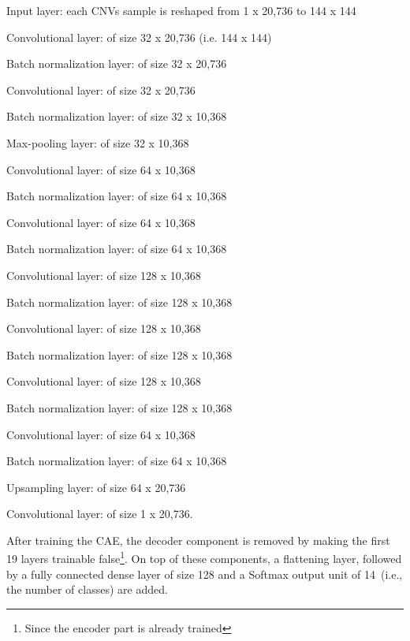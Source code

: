 \begin{enumerate}[noitemsep]
    \scriptsize{
        \item Input layer: each CNVs sample is reshaped from 1 x 20,736 to 144 x 144
        \item Convolutional layer: of size 32 x 20,736 (i.e. 144 x 144) 
        \item Batch normalization layer: of size 32 x 20,736
        \item Convolutional layer: of size 32 x 20,736
        \item Batch normalization layer: of size 32 x 10,368
        \item Max-pooling layer: of size 32 x 10,368
        \item Convolutional layer: of size 64 x 10,368
        \item Batch normalization layer: of size 64 x 10,368
        \item Convolutional layer: of size 64 x 10,368
        \item Batch normalization layer: of size 64 x 10,368
        \item Convolutional layer: of size 128 x 10,368
        \item Batch normalization layer: of size 128 x 10,368
        \item Convolutional layer: of size 128 x 10,368
        \item Batch normalization layer: of size 128 x 10,368
        \item Convolutional layer: of size 128 x 10,368
        \item Batch normalization layer: of size 128 x 10,368
        \item Convolutional layer: of size 64 x 10,368
        \item Batch normalization layer: of size 64 x 10,368
        \item Upsampling layer: of size 64 x 20,736 
        \item Convolutional layer: of size 1 x 20,736.}
\end{enumerate}

\hspace*{3.5mm} After training the CAE, the decoder component is removed by making the first 19 layers trainable false\footnote{Since the encoder part is already trained}. On top of these components, a flattening layer, followed by a fully connected dense layer of size 128 and a Softmax output unit of 14~(i.e., the number of classes) are added. 

